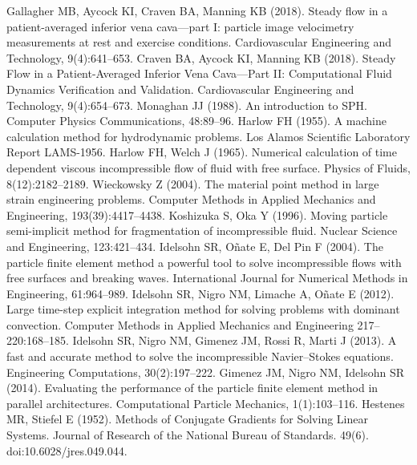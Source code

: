  Gallagher MB, Aycock KI, Craven BA, Manning KB (2018). Steady flow in a patient-averaged inferior vena cava—part I: particle image velocimetry measurements at rest and exercise conditions. Cardiovascular Engineering and Technology, 9(4):641--653.
 Craven BA, Aycock KI, Manning KB (2018). Steady Flow in a Patient-Averaged Inferior Vena Cava—Part II: Computational Fluid Dynamics Verification and Validation. Cardiovascular Engineering and Technology, 9(4):654--673.
 Monaghan JJ (1988). An introduction to SPH. Computer Physics Communications, 48:89--96.
 Harlow FH (1955). A machine calculation method for hydrodynamic problems. Los Alamos Scientific Laboratory Report LAMS-1956.
 Harlow FH, Welch J (1965). Numerical calculation of time dependent viscous incompressible flow of fluid with free surface. Physics of Fluids, 8(12):2182--2189.
 Wieckowsky Z (2004). The material point method in large strain engineering problems. Computer Methods in Applied Mechanics and Engineering, 193(39):4417--4438.
 Koshizuka S, Oka Y (1996). Moving particle semi-implicit method for fragmentation of incompressible fluid. Nuclear Science and Engineering, 123:421--434.
 Idelsohn SR, Oñate E, Del Pin F (2004). The particle finite element method a powerful tool to solve incompressible flows with free surfaces and breaking waves. International Journal for Numerical Methods in Engineering, 61:964--989.
 Idelsohn SR, Nigro NM, Limache A, Oñate E (2012). Large time-step explicit integration method for solving problems with dominant convection. Computer Methods in Applied Mechanics and Engineering 217--220:168--185.
 Idelsohn SR, Nigro NM, Gimenez JM, Rossi R, Marti J (2013). A fast and accurate method to solve the incompressible Navier--Stokes equations. Engineering Computations, 30(2):197--222.
 Gimenez JM, Nigro NM, Idelsohn SR (2014). Evaluating the performance of the particle finite element method in parallel architectures. Computational Particle Mechanics, 1(1):103--116.
 Hestenes MR, Stiefel E (1952). Methods of Conjugate Gradients for Solving Linear Systems. Journal of Research of the National Bureau of Standards. 49(6). doi:10.6028/jres.049.044.

